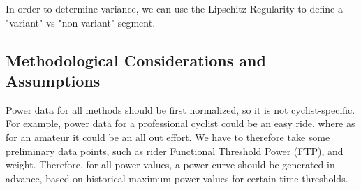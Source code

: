 \documentclass[12pt,a4paper]{report}
\begin{document}
In order to determine variance, we can use the Lipschitz Regularity to define a "variant" vs "non-variant" segment.




\subsection{Methodological Considerations and Assumptions}
Power data for all methods should be first normalized, so it is not cyclist-specific. For example, power data for a professional cyclist could be an easy ride, where as for an amateur it could be an all out effort.
We have to therefore take some preliminary data points, such as rider Functional Threshold Power (FTP), and weight.
Therefore, for all power values, a power curve should be generated in advance, based on historical maximum power values for certain time thresholds.
\end{document}
